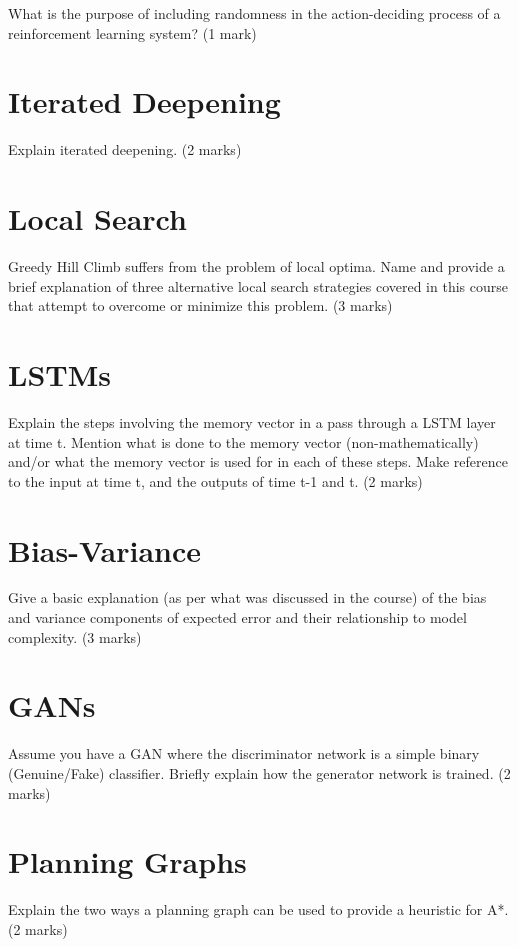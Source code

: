 \documentclass{article}
\begin{document}
What is the purpose of including randomness in the action-deciding process of a reinforcement learning system? (1 mark)\clearpage
\section{ Iterated Deepening }

Explain iterated deepening. (2 marks)
\clearpage
\section{ Local Search }

Greedy Hill Climb suffers from the problem of local optima. Name and provide a brief explanation of three alternative local search strategies covered in this course that attempt to overcome or minimize this problem. (3 marks)
\clearpage
\section{ LSTMs }

Explain the steps involving the memory vector in a pass through a LSTM layer at time t. Mention what is done to the memory vector (non-mathematically) and/or what the memory vector is used for in each of these steps. Make reference to the input at time t, and the outputs of time t-1 and t. (2 marks)\clearpage
\section{ Bias-Variance }

Give a basic explanation (as per what was discussed in the course) of the bias and variance components of expected error and their relationship to model complexity. (3 marks)
\clearpage
\section{ GANs }

Assume you have a GAN where the discriminator network is a simple binary (Genuine/Fake) classifier. Briefly explain how the generator network is trained. (2 marks)
\clearpage
\section{ Planning Graphs }

Explain the two ways a planning graph can be used to provide a heuristic for A*. (2 marks)
\end{document}
